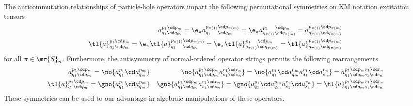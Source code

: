 \documentclass[11pt,fleqn]{article}
\numberwithin{equation}{section}
\begin{document}
\begin{rmk}\label{permutational-symmetries-of-km-notation-excitation-operators}
The anticommutation relationships of particle-hole operators impart the following permutational symmetries on KM notation excitation tensors
\begin{align}
&&
  a^{p_1\cd p_m}_{q_1\cd q_m}
=
  \e_{\pi}
  a^{p_{\pi(1)}\cd p_{\pi(m)}}_{q_1\hphantom{_{\pi()}}\cd q_m}
=
  \e_{\pi}
  a^{p_1\hphantom{_{\pi()}}\cd p_m}_{q_{\pi(1)}\cd q_{\pi(m)}}
=
  a^{p_{\pi(1)}\cd p_{\pi(m)}}_{q_{\pi(1)}\cd q_{\pi(m)}}
\\
&&
  \tl{a}^{p_1\cd p_m}_{q_1\cd q_m}
=
  \e_{\pi}
  \tl{a}^{p_{\pi(1)}\cd p_{\pi(m)}}_{q_1\hphantom{_{\pi()}}\cd q_m}
=
  \e_{\pi}
  \tl{a}^{p_1\hphantom{_{\pi()}}\cd p_m}_{q_{\pi(1)}\cd q_{\pi(m)}}
=
  \tl{a}^{p_{\pi(1)}\cd p_{\pi(m)}}_{q_{\pi(1)}\cd q_{\pi(m)}}
\end{align}
for all $\pi\in\mr{S}_n$.
Furthermore, the antisymmetry of normal-ordered operator strings permits the following rearrangements.
\begin{align}
&&
  a^{p_1\cd p_m}_{q_1\cd q_m}
=
  \no{a^{p_1}_{q_1}\cd a^{p_m}_{q_m}}
&&
  \no{a^{p_1\cd p_m}_{q_1\cd q_m}a^{r_1\cd r_n}_{s_1\cd s_n}}
=
  \no{a^{p_1}_{q_1}\cd a^{p_m}_{q_m}a^{r_1}_{s_1}\cd a^{r_n}_{s_n}}
=
  a^{p_1\cd p_mr_1\cd r_n}_{q_1\cd q_ms_1\cd s_n}
\\
&&
  \tl{a}^{p_1\cd p_m}_{q_1\cd q_m}
=
  \gno{a^{p_1}_{q_1}\cd a^{p_m}_{q_m}}
&&
  \gno{a^{p_1\cd p_m}_{q_1\cd q_m}a^{r_1\cd r_n}_{s_1\cd s_n}}
=
  \gno{a^{p_1}_{q_1}\cd a^{p_m}_{q_m}a^{r_1}_{s_1}\cd a^{r_n}_{s_n}}
=
  \tl{a}^{p_1\cd p_mr_1\cd r_n}_{q_1\cd q_ms_1\cd s_n}
\end{align}
These symmetries can be used to our advantage in algebraic manipulations of these operators.
\end{rmk}
\end{document}
